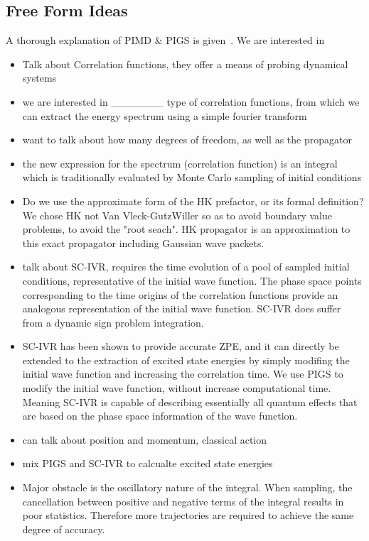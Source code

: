 \documentclass[12pt,letterpaper,oneside]{article}               %
\begin{document}
\subsection*{Free Form Ideas}
A thorough explanation of PIMD $\&$ PIGS is given~\cite{iouchtchenko2014particle}. 
We are interested in 
\begin{itemize}
	\item Talk about Correlation functions, they offer a means of probing dynamical systems
	\item we are interested in \_\_\_\_\_\_\_ type of correlation functions, from which we can extract the energy spectrum using a simple fourier transform
	\item want to talk about how many degrees of freedom, as well as the propagator
	\item the new expression for the spectrum (correlation function) is an integral which is traditionally evaluated by Monte Carlo sampling of initial conditions
	\item Do we use the approximate form of the HK prefactor, or its formal definition? We chose HK not Van Vleck-GutzWiller so as to avoid boundary value problems, to avoid the "root seach". HK propagator is an approximation to this exact propagator including Gaussian wave packets.
	\item talk about SC-IVR, requires the time evolution of a pool of sampled initial conditions, representative of the initial wave function. The phase space points corresponding to the time origins of the correlation functions provide an analogous representation of the initial wave function. SC-IVR does suffer from a dynamic sign problem integration.
	\item SC-IVR has been shown to provide accurate ZPE, and it can directly be extended to the extraction of excited state energies by simply modifing the initial wave function and increasing the correlation time. We use PIGS to modify the initial wave function, without increase computational time. Meaning SC-IVR is capable of describing essentially all quantum effects that are based on the phase space information of the wave function.
	\item can talk about position and momentum, classical action
	\item mix PIGS and SC-IVR to calcualte excited state energies
	\item Major obstacle is the oscillatory nature of the integral. When sampling, the cancellation between positive and negative terms of the integral results in poor statistics. Therefore more trajectories are required to achieve the same degree of accuracy.
\end{itemize}
\end{document}
